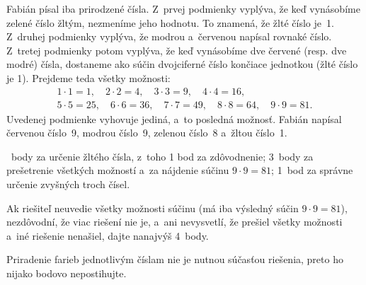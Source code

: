 {%
Fabián písal iba prirodzené čísla.
Z~prvej podmienky vyplýva, že keď vynásobíme zelené číslo žltým, nezmeníme
jeho hodnotu.
To znamená, že žlté číslo je~1.
Z~druhej podmienky vyplýva, že modrou a~červenou napísal rovnaké číslo.
Z~tretej podmienky potom vyplýva, že keď vynásobíme dve červené (resp. dve
modré) čísla, dostaneme ako súčin dvojciferné číslo končiace jednotkou
(žlté číslo je 1).
Prejdeme teda všetky možnosti:
$$
\begin{gathered}
1\cdot1=1,\quad
2\cdot2=4,\quad
3\cdot3=9,\quad
4\cdot4=16,\\
5\cdot5=25,\quad
6\cdot6=36,\quad
7\cdot7=49,\quad
8\cdot8=64,\quad
9\cdot9=81.
\end{gathered}
$$
Uvedenej podmienke vyhovuje jediná, a~to posledná možnosť.
Fabián napísal červenou číslo~9, modrou číslo~9, zelenou číslo~8 a~žltou číslo~1.

~body za určenie žltého čísla, z~toho 1 bod za zdôvodnenie;
3~body za prešetrenie všetkých možností a~za nájdenie súčinu $9\cdot9=81$;
1~bod za správne určenie zvyšných troch čísel.

Ak riešiteľ neuvedie všetky možnosti súčinu (má iba výsledný súčin
$9\cdot9=81$), nezdôvodní, že viac riešení nie je, a~ani nevysvetlí, že prešiel
všetky možnosti a~iné riešenie nenašiel, dajte nanajvýš 4~body.

Priradenie farieb jednotlivým číslam nie je nutnou súčasťou riešenia, preto ho
nijako bodovo nepostihujte.
\endhodnotenie
}

